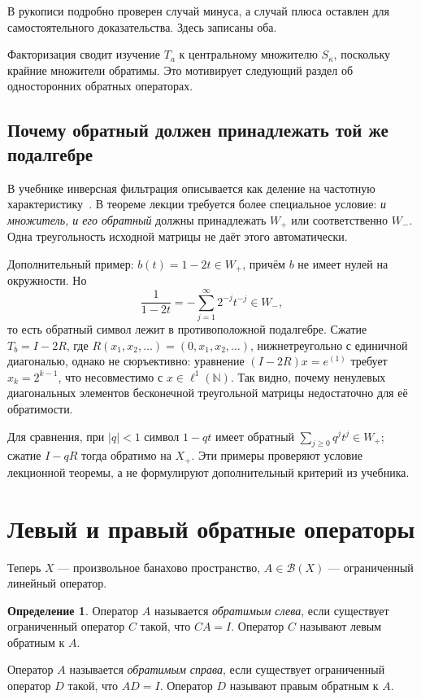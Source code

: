 \documentclass[12pt,a4paper]{article}
\theoremstyle{definition}
\newtheorem{definition}{Определение}
\theoremstyle{remark}
\begin{document}
В рукописи подробно проверен случай минуса, а случай плюса оставлен
для самостоятельного доказательства. Здесь записаны оба.

Факторизация сводит изучение $T_a$ к центральному множителю
$S_\kappa$, поскольку крайние множители обратимы. Это мотивирует
следующий раздел об односторонних обратных операторах.

\subsection*{Почему обратный должен принадлежать той же подалгебре}

В учебнике инверсная фильтрация описывается как деление на частотную
характеристику~\cite[\S\,5.7, с.~412]{GW2012}.
В теореме лекции требуется более специальное условие:
\emph{и множитель, и его обратный} должны принадлежать $W_+$
или соответственно $W_-$. Одна треугольность исходной матрицы
не даёт этого автоматически.

Дополнительный пример: $b(t)=1-2t\in W_+$, причём $b$ не имеет
нулей на окружности. Но
\[
  \frac1{1-2t}=-\sum_{j=1}^{\infty}2^{-j}t^{-j}\in W_-,
\]
то есть обратный символ лежит в противоположной подалгебре.
Сжатие $T_b=I-2R$, где $R(x_1,x_2,\ldots)=(0,x_1,x_2,\ldots)$,
нижнетреугольно с единичной диагональю, однако не сюръективно:
уравнение $(I-2R)x=e^{(1)}$ требует
$x_k=2^{k-1}$, что несовместимо с $x\in\ell^1(\mathbb N)$.
Так видно, почему ненулевых диагональных элементов бесконечной
треугольной матрицы недостаточно для её обратимости.

Для сравнения, при $|q|<1$ символ $1-qt$ имеет обратный
$\sum_{j\geqslant0}q^jt^j\in W_+$; сжатие $I-qR$ тогда обратимо
на $X_+$. Эти примеры проверяют условие лекционной теоремы,
а не формулируют дополнительный критерий из учебника.

\section{Левый и правый обратные операторы}

Теперь $X$ --- произвольное банахово пространство,
$A\in\mathcal B(X)$ --- ограниченный линейный оператор.

\begin{definition}
Оператор $A$ называется \emph{обратимым слева}, если существует
ограниченный оператор $C$ такой, что $CA=I$.
Оператор $C$ называют левым обратным к $A$.

Оператор $A$ называется \emph{обратимым справа}, если существует
ограниченный оператор $D$ такой, что $AD=I$.
Оператор $D$ называют правым обратным к $A$.
\end{definition}
\end{document}
